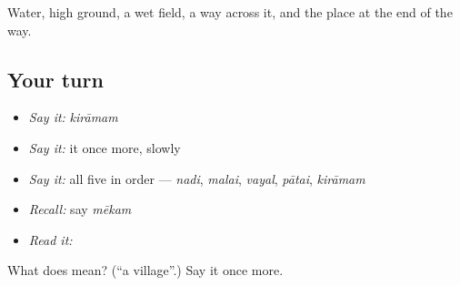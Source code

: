 \begin{grammarlens}[title={What you've built}]
Water, high ground, a wet field, a way across it, and the place at the end of the way.
\end{grammarlens}

\subsection*{Your turn}
\begin{itemize}
\raggedright
  \item \emph{Say it:} \emph{kirāmam}
  \item \emph{Say it:} it once more, slowly
  \item \emph{Say it:} all five in order — \emph{nadi}, \emph{malai}, \emph{vayal}, \emph{pātai}, \emph{kirāmam}
  \item \emph{Recall:} say \emph{mēkam}
  \item \emph{Read it:} \textbf{}
\end{itemize}

\begin{tcolorbox}[breakable,colback=teal!4,colframe=teal!35!black,title={Before you move on}]
What does  mean? (\textquotedblleft{}a village\textquotedblright{}.) Say it once more.
\end{tcolorbox}
